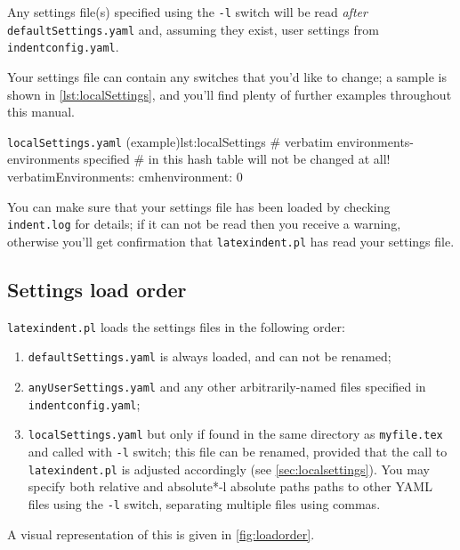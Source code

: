 	Any settings file(s) specified using the \texttt{-l} switch will be read \emph{after} \texttt{defaultSettings.yaml} and, assuming they exist,
	user settings from \texttt{indentconfig.yaml}.

	Your settings file can contain any switches that you'd
	like to change; a sample is shown in \cref{lst:localSettings}, and you'll find plenty of further examples throughout this manual.

	\begin{yaml}{\texttt{localSettings.yaml} (example)}{lst:localSettings}
#  verbatim environments- environments specified
#  in this hash table will not be changed at all!
verbatimEnvironments:
    cmhenvironment: 0
\end{yaml}

	You can make sure that your settings file has been loaded by checking \texttt{indent.log}
	for details; if it can not be read then you receive a warning, otherwise you'll get confirmation that
	\texttt{latexindent.pl} has read your settings file.

\subsection{Settings load order}\label{sec:loadorder}
	\texttt{latexindent.pl} loads the settings files in the following order:
	\begin{enumerate}
		\item \texttt{defaultSettings.yaml} is always loaded, and can not be renamed;
		\item \texttt{anyUserSettings.yaml} and any other arbitrarily-named files specified in \texttt{indentconfig.yaml};
		\item \texttt{localSettings.yaml} but only if found in the same directory as \texttt{myfile.tex} and called
		      with \texttt{-l} switch; this file can be renamed, provided that the call to \texttt{latexindent.pl} is adjusted
		      accordingly (see \cref{sec:localsettings}). You may specify both relative and absolute*{-l absolute paths} paths to other
		      YAML files using the \texttt{-l} switch, separating multiple files using commas.
	\end{enumerate}
	A visual representation of this is given in \cref{fig:loadorder}.

